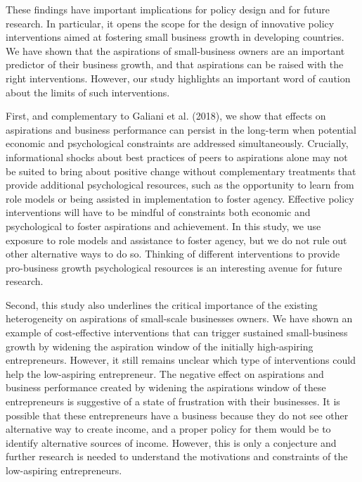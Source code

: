 \documentclass[11.5pt]{article}
\begin{document}
These findings have important implications for policy design and for future research. In particular, it opens the scope for the design of innovative policy interventions aimed at fostering small business growth in developing countries. We have shown that the aspirations of small-business owners are an important predictor of their business growth, and that aspirations can be raised with the right interventions. However, our study highlights an important word of caution about the limits of such interventions.

First, and complementary to Galiani et al. (2018), we show that effects on aspirations and business performance can persist in the long-term when potential economic and psychological constraints are addressed simultaneously. Crucially, informational shocks about best practices of peers to aspirations alone may not be suited to bring about positive change without complementary treatments that provide additional psychological resources, such as the opportunity to learn from role models or being assisted in implementation to foster agency. Effective policy interventions will have to be mindful of constraints both economic and psychological to foster aspirations and achievement. In this study, we use exposure to role models and assistance to foster agency, but we do not rule out other alternative ways to do so. Thinking of different interventions to provide pro-business growth psychological resources is an interesting avenue for future research.

Second, this study also underlines the critical importance of the existing heterogeneity on aspirations of small-scale businesses owners. We have shown an example of cost-effective interventions that can trigger sustained small-business growth by widening the aspiration window of the initially high-aspiring entrepreneurs. However, it still remains unclear which type of interventions could help the low-aspiring entrepreneur. The negative effect on aspirations and business performance created by  widening the aspirations window of these entrepreneurs is suggestive of a state of frustration with their businesses. It is possible that these entrepreneurs have a business because they do not see other alternative way to create income, and a proper policy for them would be to identify alternative sources of income. However, this is only a conjecture and further research is needed to understand the motivations and constraints of the low-aspiring entrepreneurs.

\end{document}
